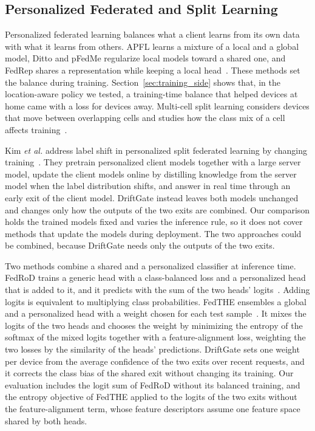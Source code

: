 \subsection{Personalized Federated and Split Learning}

Personalized federated learning balances what a client learns from its own data with what it learns from others. APFL learns a mixture of a local and a global model, Ditto and pFedMe regularize local models toward a shared one, and FedRep shares a representation while keeping a local head~\cite{deng2020apfl,li2021ditto,tdinh2020pfedme,collins2021fedrep}. These methods set the balance during training. Section~\ref{sec:training_side} shows that, in the location-aware policy we tested, a training-time balance that helped devices at home came with a loss for devices away. Multi-cell split learning considers devices that move between overlapping cells and studies how the class mix of a cell affects training~\cite{rizwan2026splitomc}.

Kim \emph{et al.} address label shift in personalized split federated learning by changing training~\cite{kim2025onlinepsfl}. They pretrain personalized client models together with a large server model, update the client models online by distilling knowledge from the server model when the label distribution shifts, and answer in real time through an early exit of the client model. DriftGate instead leaves both models unchanged and changes only how the outputs of the two exits are combined. Our comparison holds the trained models fixed and varies the inference rule, so it does not cover methods that update the models during deployment. The two approaches could be combined, because DriftGate needs only the outputs of the two exits.

Two methods combine a shared and a personalized classifier at inference time. FedRoD trains a generic head with a class-balanced loss and a personalized head that is added to it, and it predicts with the sum of the two heads' logits~\cite{chen2022fedrod}. Adding logits is equivalent to multiplying class probabilities. FedTHE ensembles a global and a personalized head with a weight chosen for each test sample~\cite{jiang2023fedthe}. It mixes the logits of the two heads and chooses the weight by minimizing the entropy of the softmax of the mixed logits together with a feature-alignment loss, weighting the two losses by the similarity of the heads' predictions. DriftGate sets one weight per device from the average confidence of the two exits over recent requests, and it corrects the class bias of the shared exit without changing its training. Our evaluation includes the logit sum of FedRoD without its balanced training, and the entropy objective of FedTHE applied to the logits of the two exits without the feature-alignment term, whose feature descriptors assume one feature space shared by both heads.

